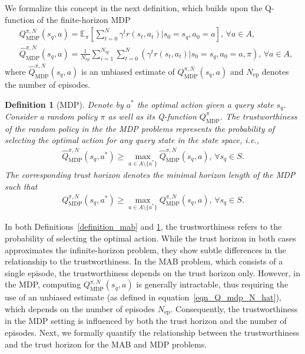 \documentclass[10pt]{article}
\def\eqref#1{equation~\ref{#1}}
\newtheorem{definition}{Definition}
\def\mbE{{\ensuremath{\mathbb E}}}
\begin{document}
We formalize this concept in the next definition, which builds upon the Q-function of the finite-horizon MDP
\begin{align}
    &Q_\text{MDP}^{\pi, N}(s_q, a) = \mbE_\pi \!\! \left[ \sum_{t=0}^{N} \gamma^t r(s_t, a_t) | s_0=s_q, a_0=a \right],\, \forall a \in A, \\
    &\hat{Q}_\text{MDP}^{\pi, N}(s_q, a) \!=\! \frac{1}{N_\text{ep}} \sum_{i=1}^{N_\text{ep}} \sum_{t=0}^{N} \! \left( \gamma^t r(s_t, a_t) | s_0=s_q, a_0=a, \pi \right),\, \forall a \in A, \label{eqn_Q_mdp_N_hat}
\end{align}
where $\hat{Q}_\text{MDP}^{\pi, N}(s_q, a)$ is an unbiased estimate of $Q_\text{MDP}^{\pi, N}(s_q, a)$ and $N_\text{ep}$ denotes the number of episodes.
\begin{definition}[MDP]\label{definition_mdp}
    Denote by $a^*$ the optimal action given a query state $s_q$. Consider a random policy $\pi$ as well as its Q-function $Q_\text{MDP}^\pi$.
    The trustworthiness of the random policy in the the MDP problems represents the probability of selecting the optimal action for any query state in the state space, i.e.,
    \begin{align}
        \hat{Q}_\text{MDP}^{\pi, N}(s_q, a^*) \geq \max_{a \in A \setminus \{a^*\}} \hat{Q}_\text{MDP}^{\pi, N}(s_q, a), \, \forall s_q \in S.
    \end{align}
    The corresponding trust horizon denotes the minimal horizon length of the MDP such that
    \begin{align}
        Q_\text{MDP}^{\pi, N}(s_q, a^*) \geq \max_{a \in A \setminus \{a^*\}} Q_\text{MDP}^{\pi, N}(s_q, a), \, \forall s_q \in S.
    \end{align}
\end{definition}
In both Definitions~\ref{definition_mab} and \ref{definition_mdp}, the trustworthiness refers to the probability of selecting the optimal action. While the trust horizon in both cases approximates the infinite-horizon problem, they show subtle differences in the relationship to the trustworthiness.
In the MAB problem, which consists of a single episode, the trustworthiness depends on the trust horizon only. However, in the MDP, computing \( Q_\text{MDP}^{\pi, N}(s_q, a) \) is generally intractable, thus requiring the use of an unbiased estimate (as defined in \eqref{eqn_Q_mdp_N_hat}), which depends on the number of episodes \( N_\text{ep} \). Consequently, the trustworthiness in the MDP setting is influenced by both the trust horizon and the number of episodes.
Next, we formally quantify the relationship between the trustworthiness and the trust horizon for the MAB and MDP problems.
\end{document}

